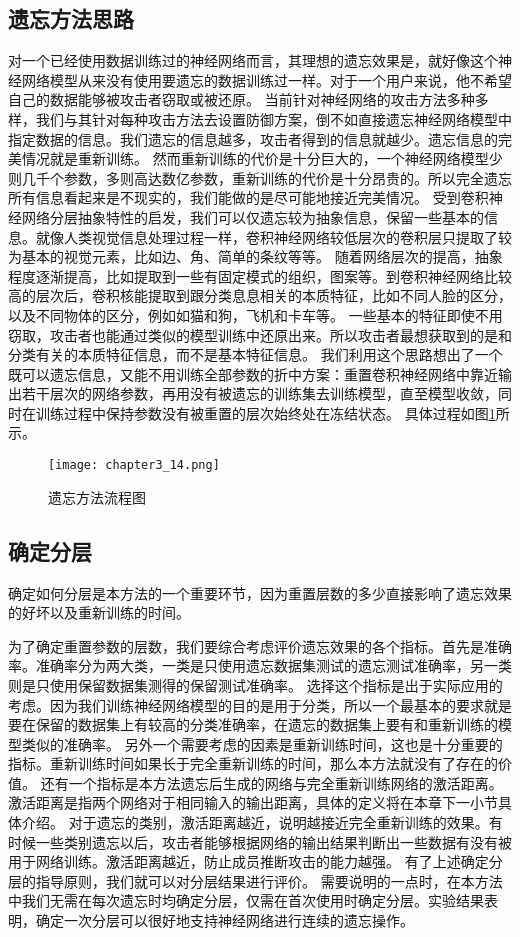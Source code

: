 \subsection{遗忘方法思路}
对一个已经使用数据训练过的神经网络而言，其理想的遗忘效果是，就好像这个神经网络模型从来没有使用要遗忘的数据训练过一样。对于一个用户来说，他不希望自己的数据能够被攻击者窃取或被还原。
当前针对神经网络的攻击方法多种多样，我们与其针对每种攻击方法去设置防御方案，倒不如直接遗忘神经网络模型中指定数据的信息。我们遗忘的信息越多，攻击者得到的信息就越少。遗忘信息的完美情况就是重新训练。
然而重新训练的代价是十分巨大的，一个神经网络模型少则几千个参数，多则高达数亿参数，重新训练的代价是十分昂贵的。所以完全遗忘所有信息看起来是不现实的，我们能做的是尽可能地接近完美情况。
受到卷积神经网络分层抽象特性的启发，我们可以仅遗忘较为抽象信息，保留一些基本的信息。就像人类视觉信息处理过程一样，卷积神经网络较低层次的卷积层只提取了较为基本的视觉元素，比如边、角、简单的条纹等等。
随着网络层次的提高，抽象程度逐渐提高，比如提取到一些有固定模式的组织，图案等。到卷积神经网络比较高的层次后，卷积核能提取到跟分类息息相关的本质特征，比如不同人脸的区分，以及不同物体的区分，例如如猫和狗，飞机和卡车等。
一些基本的特征即使不用窃取，攻击者也能通过类似的模型训练中还原出来。所以攻击者最想获取到的是和分类有关的本质特征信息，而不是基本特征信息。
我们利用这个思路想出了一个既可以遗忘信息，又能不用训练全部参数的折中方案：重置卷积神经网络中靠近输出若干层次的网络参数，再用没有被遗忘的训练集去训练模型，直至模型收敛，同时在训练过程中保持参数没有被重置的层次始终处在冻结状态。
具体过程如图\ref{fig:chapter3_14}所示。
\begin{figure}
    \centering
    \texttt{[image: chapter3\_14.png]}
    \caption{遗忘方法流程图}
    \label{fig:chapter3_14}
\end{figure}

\subsection{确定分层}
确定如何分层是本方法的一个重要环节，因为重置层数的多少直接影响了遗忘效果的好坏以及重新训练的时间。

为了确定重置参数的层数，我们要综合考虑评价遗忘效果的各个指标。首先是准确率。准确率分为两大类，一类是只使用遗忘数据集测试的遗忘测试准确率，另一类则是只使用保留数据集测得的保留测试准确率。
选择这个指标是出于实际应用的考虑。因为我们训练神经网络模型的目的是用于分类，所以一个最基本的要求就是要在保留的数据集上有较高的分类准确率，在遗忘的数据集上要有和重新训练的模型类似的准确率。
另外一个需要考虑的因素是重新训练时间，这也是十分重要的指标。重新训练时间如果长于完全重新训练的时间，那么本方法就没有了存在的价值。
还有一个指标是本方法遗忘后生成的网络与完全重新训练网络的激活距离。激活距离是指两个网络对于相同输入的输出距离，具体的定义将在本章下一小节具体介绍。
对于遗忘的类别，激活距离越近，说明越接近完全重新训练的效果。有时候一些类别遗忘以后，攻击者能够根据网络的输出结果判断出一些数据有没有被用于网络训练。激活距离越近，防止成员推断攻击的能力越强。
有了上述确定分层的指导原则，我们就可以对分层结果进行评价。
需要说明的一点时，在本方法中我们无需在每次遗忘时均确定分层，仅需在首次使用时确定分层。实验结果表明，确定一次分层可以很好地支持神经网络进行连续的遗忘操作。

